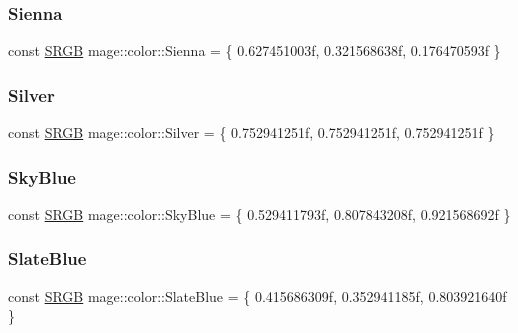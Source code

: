 \hypertarget{namespacemage_1_1color_a57c451da6e57e8e9d8b422d103830fda}{}\label{namespacemage_1_1color_a57c451da6e57e8e9d8b422d103830fda} 
\subsubsection{\texorpdfstring{Sienna}{Sienna}}
{\footnotesize\ttfamily const \hyperlink{structmage_1_1_s_r_g_b}{S\+R\+GB} mage\+::color\+::\+Sienna = \{ 0.\+627451003f, 0.\+321568638f, 0.\+176470593f \}}

\hypertarget{namespacemage_1_1color_aa35ea9998a648b6577401868083e6e80}{}\label{namespacemage_1_1color_aa35ea9998a648b6577401868083e6e80} 
\subsubsection{\texorpdfstring{Silver}{Silver}}
{\footnotesize\ttfamily const \hyperlink{structmage_1_1_s_r_g_b}{S\+R\+GB} mage\+::color\+::\+Silver = \{ 0.\+752941251f, 0.\+752941251f, 0.\+752941251f \}}

\hypertarget{namespacemage_1_1color_a4c554165ede328affff8cafd97a59d14}{}\label{namespacemage_1_1color_a4c554165ede328affff8cafd97a59d14} 
\subsubsection{\texorpdfstring{Sky\+Blue}{SkyBlue}}
{\footnotesize\ttfamily const \hyperlink{structmage_1_1_s_r_g_b}{S\+R\+GB} mage\+::color\+::\+Sky\+Blue = \{ 0.\+529411793f, 0.\+807843208f, 0.\+921568692f \}}

\hypertarget{namespacemage_1_1color_a2bff1d57080a8c8bf0e91d527cd8b7fc}{}\label{namespacemage_1_1color_a2bff1d57080a8c8bf0e91d527cd8b7fc} 
\subsubsection{\texorpdfstring{Slate\+Blue}{SlateBlue}}
{\footnotesize\ttfamily const \hyperlink{structmage_1_1_s_r_g_b}{S\+R\+GB} mage\+::color\+::\+Slate\+Blue = \{ 0.\+415686309f, 0.\+352941185f, 0.\+803921640f \}}

